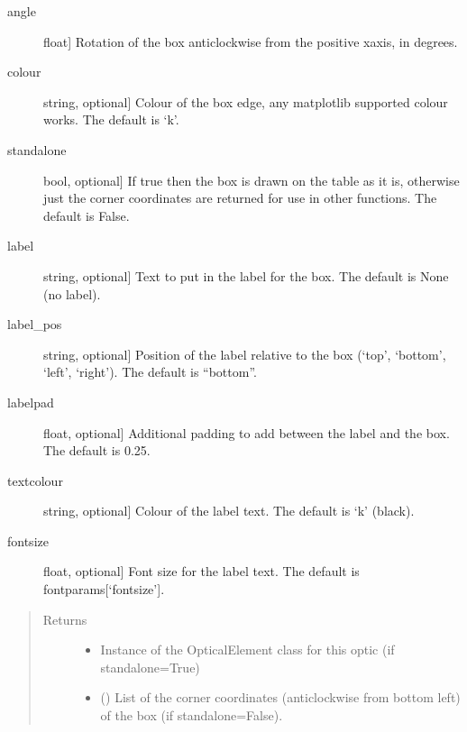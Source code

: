 \documentclass[letterpaper,10pt,english]{sphinxmanual}
\begin{document}
\begin{fulllineitems}
\begin{fulllineitems}
\begin{description}
\item[{angle}] \leavevmode{[}float{]}
\sphinxAtStartPar
Rotation of the box anticlockwise from the positive x\sphinxhyphen{}axis, in degrees.

\item[{colour}] \leavevmode{[}string, optional{]}
\sphinxAtStartPar
Colour of the box edge, any matplotlib supported colour works. The default is ‘k’.

\item[{standalone}] \leavevmode{[}bool, optional{]}
\sphinxAtStartPar
If true then the box is drawn on the table as it is, otherwise just
the corner coordinates are returned for use in other functions. The default is False.

\item[{label}] \leavevmode{[}string, optional{]}
\sphinxAtStartPar
Text to put in the label for the box. The default is None (no label).

\item[{label\_pos}] \leavevmode{[}string, optional{]}
\sphinxAtStartPar
Position of the label relative to the box (‘top’, ‘bottom’, ‘left’, ‘right’).
The default is “bottom”.

\item[{labelpad}] \leavevmode{[}float, optional{]}
\sphinxAtStartPar
Additional padding to add between the label and the box. The default is 0.25.

\item[{textcolour}] \leavevmode{[}string, optional{]}
\sphinxAtStartPar
Colour of the label text. The default is ‘k’ (black).

\item[{fontsize}] \leavevmode{[}float, optional{]}
\sphinxAtStartPar
Font size for the label text. The default is fontparams{[}‘fontsize’{]}.

\end{description}
\begin{quote}\begin{description}
\item[{Returns}] \leavevmode
\sphinxAtStartPar
\begin{itemize}
\item {} 
\sphinxAtStartPar
{} \textendash{} Instance of the OpticalElement class for this optic (if standalone=True)

\item {} 
\sphinxAtStartPar
{} () \textendash{} List of the corner coordinates (anticlockwise from bottom left) of
the box (if standalone=False).


\end{itemize}
\end{description}
\end{quote}
\end{fulllineitems}
\end{fulllineitems}
\end{document}
